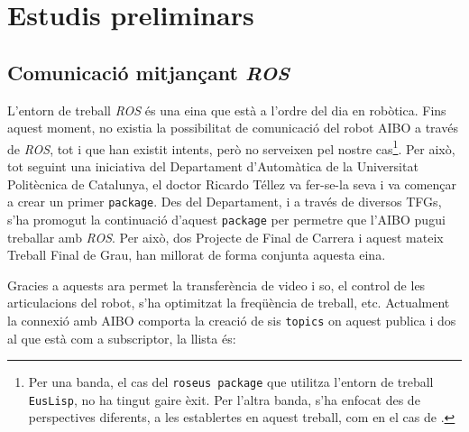 \documentclass[12pt,a4paper,final,twoside]{report}
\begin{document}
\newpage

\chapter{Estudis preliminars}
\label{Estudis-preliminars}


\section{Comunicació mitjançant \textit{ROS}}
\label{ROS-estudi-pre}

L'entorn de treball \textit{ROS} és una eina que està a l'ordre del dia en robòtica. Fins aquest moment, no existia la possibilitat de comunicació del robot AIBO a través de \textit{ROS}, tot i que han existit intents, però no serveixen pel nostre cas\footnote{Per una banda, el cas del \texttt{roseus package} \cite{Okada} que utilitza l'entorn de treball \texttt{EusLisp}, no ha tingut gaire èxit. Per l'altra banda, s'ha enfocat des de perspectives diferents, a les establertes en aquest treball, com en el cas de \cite{Rofer2013}.}. Per això, tot seguint una iniciativa del Departament d'Automàtica de la Universitat Politècnica de Catalunya, el doctor Ricardo Téllez va fer-se-la seva i va començar a crear un primer \texttt{package}. Des del Departament, i a través de diversos TFGs, s'ha promogut la continuació d'aquest \texttt{package} per permetre que l'AIBO pugui treballar amb \textit{ROS}. Per això, dos Projecte de Final de Carrera i aquest mateix Treball Final de Grau, han millorat de forma conjunta aquesta eina. 

Gracies a aquests ara permet la transferència de video i so, el control de les articulacions del robot, s'ha optimitzat la freqüència de treball, etc. Actualment la connexió amb AIBO comporta la creació de sis \texttt{topics} on aquest publica i dos al que està com a subscriptor, la llista és:
\end{document}
